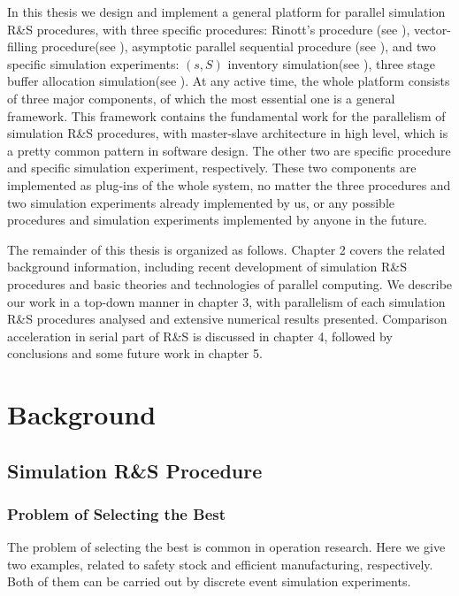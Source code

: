 \documentclass[12pt,a4paper]{report}
\begin{document}
In this thesis we design and implement a general platform for parallel simulation R\&S procedures, with three specific procedures: Rinott's procedure (see \cite{cistam1978rinott}), vector-filling procedure(see \cite{ras-seq-parallel}), asymptotic parallel sequential procedure (see \cite{ras-seq-parallel}), and two specific simulation experiments: $(s, S)$ inventory simulation(see \cite{cissac1985ss}), three stage buffer allocation simulation(see \cite{smoms93threestage}). At any active time, the whole platform consists of three major components, of which the most essential one is a general framework. This framework contains the fundamental work for the parallelism of simulation R\&S procedures, with master-slave architecture in high level, which is a pretty common pattern in software design. The other two are specific procedure and specific simulation experiment, respectively. These two components are implemented as plug-ins of the whole system, no matter the three procedures and two simulation experiments already implemented by us, or any possible procedures and simulation experiments implemented by anyone in the future.

The remainder of this thesis is organized as follows. Chapter 2 covers the related background information, including recent development of simulation R\&S procedures and basic theories and technologies of parallel computing. We describe our work in a top-down manner in chapter 3, with parallelism of each simulation R\&S procedures analysed and extensive numerical results presented. Comparison acceleration in serial part of R\&S is discussed in chapter 4, followed by conclusions and some future work in chapter 5.

\chapter{Background}

\section{Simulation R\&S Procedure}

\subsection{Problem of Selecting the Best}

The problem of selecting the best is common in operation research. Here we give two examples, related to safety stock and efficient manufacturing, respectively. Both of them can be carried out by discrete event simulation experiments.
\end{document}
